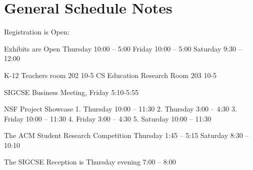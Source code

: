 {\centering
\section*{General Schedule Notes}
}

Registration is Open:

Exhibits are Open 
Thursday 10:00 -- 5:00
Friday 10:00 -- 5:00 
Saturday 9:30 -- 12:00


K-12 Teachers room 202 10-5
CS Education Research Room 203  10-5


SIGCSE Business Meeting, Friday 5:10-5:55

NSF Project Showcase
1. Thursday 10:00 -- 11:30
2. Thursday 3:00 -- 4:30
3. Friday 10:00 -- 11:30
4. Friday 3:00 -- 4:30
5. Saturday 10:00 -- 11:30

The ACM Student Research Competition
Thursday 1:45 -- 5:15
Saturday 8:30 -- 10:10

The SIGCSE Reception is Thursday evening  7:00 -- 8:00

\newpage